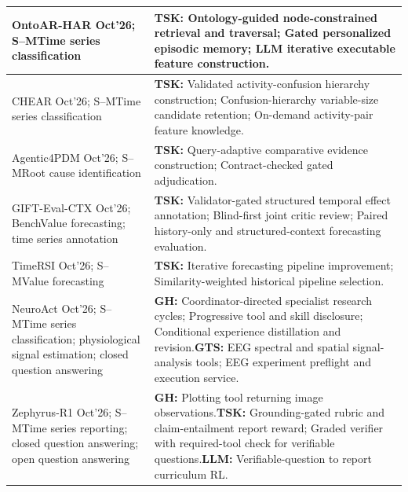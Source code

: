 \documentclass[preprints,article,submit,moreauthors]{Definitions/mdpi}
\newcommand{\typeSMshort}{\textsf{S--M}}
\newcommand{\typeBenchshort}{\textsf{Bench}}
\newcommand{\selfclaim}{\textsuperscript{\dag}}
\begin{document}
\begin{longtable}{@{}>{\raggedright\arraybackslash}p{}p{}@{}}
OntoAR-HAR \citep{ontoarhar2026} Oct'26; \typeSMshort{}\newline Time series classification & \textbf{TSK:} Ontology-guided node-constrained retrieval and traversal; Gated personalized episodic memory; LLM iterative executable feature construction.\\\midrule
CHEAR \citep{chear2026}\selfclaim{} Oct'26; \typeSMshort{}\newline Time series classification & \textbf{TSK:} Validated activity-confusion hierarchy construction; Confusion-hierarchy variable-size candidate retention; On-demand activity-pair feature knowledge.\\\midrule
Agentic4PDM \citep{agentic4pdm2026} Oct'26; \typeSMshort{}\newline Root cause identification & \textbf{TSK:} Query-adaptive comparative evidence construction; Contract-checked gated adjudication.\\\midrule
GIFT-Eval-CTX \citep{giftevalctx2026} Oct'26; \typeBenchshort{}\newline Value forecasting; time series annotation & \textbf{TSK:} Validator-gated structured temporal effect annotation; Blind-first joint critic review; Paired history-only and structured-context forecasting evaluation.\\\midrule
TimeRSI \citep{timersi2026} Oct'26; \typeSMshort{}\newline Value forecasting & \textbf{TSK:} Iterative forecasting pipeline improvement; Similarity-weighted historical pipeline selection.\\\midrule
NeuroAct \citep{neuroact2026} Oct'26; \typeSMshort{}\newline Time series classification; physiological signal estimation; closed question answering & \textbf{GH:} Coordinator-directed specialist research cycles; Progressive tool and skill disclosure; Conditional experience distillation and revision.\newline\textbf{GTS:} EEG spectral and spatial signal-analysis tools; EEG experiment preflight and execution service.\\\midrule
Zephyrus-R1 \citep{zephyrusr12026} Oct'26; \typeSMshort{}\newline Time series reporting; closed question answering; open question answering & \textbf{GH:} Plotting tool returning image observations.\newline\textbf{TSK:} Grounding-gated rubric and claim-entailment report reward; Graded verifier with required-tool check for verifiable questions.\newline\textbf{LLM:} Verifiable-question to report curriculum RL.\\\midrule

\end{longtable}
\end{document}
